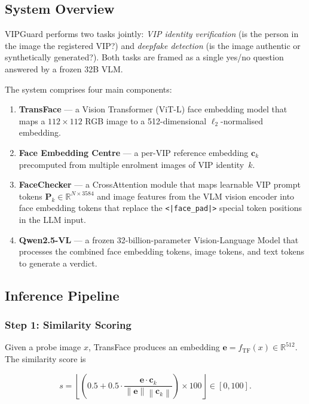 \documentclass[12pt,a4paper]{article}
\newcommand{\norm}[1]{\left\lVert#1\right\rVert}
\begin{document}
\subsection{System Overview}

VIPGuard performs two tasks jointly: \emph{VIP identity verification} (is the
person in the image the registered VIP?) and \emph{deepfake detection} (is the
image authentic or synthetically generated?).  Both tasks are framed as a
single yes/no question answered by a frozen 32B VLM.

The system comprises four main components:

\begin{enumerate}[leftmargin=*]
  \item \textbf{TransFace} --- a Vision Transformer (ViT-L) face embedding model
  that maps a $112\times112$ RGB image to a 512-dimensional $\ell_2$-normalised
  embedding.

  \item \textbf{Face Embedding Centre} --- a per-VIP reference embedding $\mathbf{c}_k$
  precomputed from multiple enrolment images of VIP identity~$k$.

  \item \textbf{FaceChecker} --- a CrossAttention module that maps learnable VIP
  prompt tokens $\mathbf{P}_k \in \mathbb{R}^{N \times 3584}$ and image features
  from the VLM vision encoder into face embedding tokens that replace the
  \texttt{<|face\_pad|>} special token positions in the LLM input.

  \item \textbf{Qwen2.5-VL} --- a frozen 32-billion-parameter Vision-Language
  Model that processes the combined face embedding tokens, image tokens, and text
  tokens to generate a verdict.
\end{enumerate}

\subsection{Inference Pipeline}

\subsubsection{Step 1: Similarity Scoring}

Given a probe image $x$, TransFace produces an embedding
$\mathbf{e} = f_{\text{TF}}(x) \in \mathbb{R}^{512}$.  The similarity score is

\begin{equation}
  s = \left\lfloor \left( 0.5 + 0.5 \cdot
  \frac{\mathbf{e} \cdot \mathbf{c}_k}{\norm{\mathbf{e}}\norm{\mathbf{c}_k}}
  \right) \times 100 \right\rfloor \in [0, 100].
  \label{eq:sim}
\end{equation}
\end{document}
